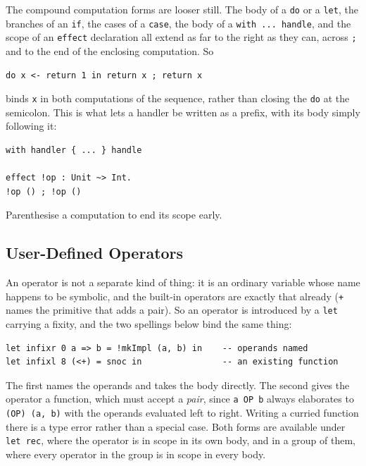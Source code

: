 \documentclass[11pt,a4paper]{article}
\newcommand{\cba}[1]{\lstinline[style=cbainline]{#1}}
\begin{document}
The compound computation forms are looser still.  The body of a \cba{do} or a
\cba{let}, the branches of an \cba{if}, the cases of a \cba{case}, the body of a
\cba{with ... handle}, and the scope of an \cba{effect} declaration all extend
as far to the right as they can, across \texttt{;} and to the end of the
enclosing computation.  So

\begin{lstlisting}
do x <- return 1 in return x ; return x
\end{lstlisting}

binds \texttt{x} in both computations of the sequence, rather than closing
the \cba{do} at the semicolon.  This is what lets a handler be written as a
prefix, with its body simply following it:

\begin{lstlisting}
with handler { ... } handle

effect !op : Unit ~> Int.
!op () ; !op ()
\end{lstlisting}

Parenthesise a computation to end its scope early.

\subsection{User-Defined Operators}
\label{sec:fixity}

An operator is not a separate kind of thing: it is an ordinary variable whose
name happens to be symbolic, and the built-in operators are exactly that
already (\texttt{+} names the primitive that adds a pair).  So an operator is
introduced by a \cba{let} carrying a fixity, and the two spellings below bind
the same thing:

\begin{lstlisting}
let infixr 0 a => b = !mkImpl (a, b) in    -- operands named
let infixl 8 (<+) = snoc in                -- an existing function
\end{lstlisting}

The first names the operands and takes the body directly.  The second gives
the operator a function, which must accept a \emph{pair}, since \cba{a OP b}
always elaborates to \cba{(OP) (a, b)} with the operands evaluated left to
right.  Writing a curried function there is a type error rather than a
special case.  Both forms are available under \cba{let rec}, where the
operator is in scope in its own body, and in a group of them, where every
operator in the group is in scope in every body.
\end{document}
